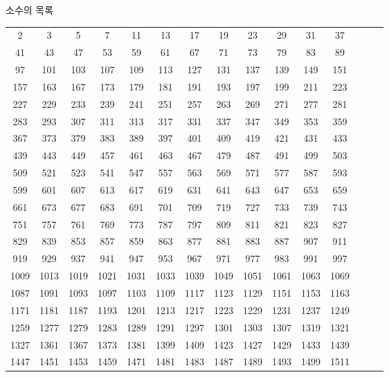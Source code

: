 \documentclass[10pt, a4paper]{article}
\begin{document}
\begin{center}
    \huge{소수의 목록}\normalsize\\
    \begin{longtable}{c c c c c c c c c c c c c c c}
        \hline
        2 & 3 & 5 & 7 & 11 & 13 & 17 & 19 & 23 & 29 & 31 & 37 \\
        41 & 43 & 47 & 53 & 59 & 61 & 67 & 71 & 73 & 79 & 83 & 89 \\
        97 & 101 & 103 & 107 & 109 & 113 & 127 & 131 & 137 & 139 & 149 & 151 \\
        157 & 163 & 167 & 173 & 179 & 181 & 191 & 193 & 197 & 199 & 211 & 223 \\
        227 & 229 & 233 & 239 & 241 & 251 & 257 & 263 & 269 & 271 & 277 & 281 \\
        283 & 293 & 307 & 311 & 313 & 317 & 331 & 337 & 347 & 349 & 353 & 359 \\
        367 & 373 & 379 & 383 & 389 & 397 & 401 & 409 & 419 & 421 & 431 & 433 \\
        439 & 443 & 449 & 457 & 461 & 463 & 467 & 479 & 487 & 491 & 499 & 503 \\
        509 & 521 & 523 & 541 & 547 & 557 & 563 & 569 & 571 & 577 & 587 & 593 \\
        599 & 601 & 607 & 613 & 617 & 619 & 631 & 641 & 643 & 647 & 653 & 659 \\
        661 & 673 & 677 & 683 & 691 & 701 & 709 & 719 & 727 & 733 & 739 & 743 \\
        751 & 757 & 761 & 769 & 773 & 787 & 797 & 809 & 811 & 821 & 823 & 827 \\
        829 & 839 & 853 & 857 & 859 & 863 & 877 & 881 & 883 & 887 & 907 & 911 \\
        919 & 929 & 937 & 941 & 947 & 953 & 967 & 971 & 977 & 983 & 991 & 997 \\
        1009 & 1013 & 1019 & 1021 & 1031 & 1033 & 1039 & 1049 & 1051 & 1061 & 1063 & 1069 \\
        1087 & 1091 & 1093 & 1097 & 1103 & 1109 & 1117 & 1123 & 1129 & 1151 & 1153 & 1163 \\
        1171 & 1181 & 1187 & 1193 & 1201 & 1213 & 1217 & 1223 & 1229 & 1231 & 1237 & 1249 \\
        1259 & 1277 & 1279 & 1283 & 1289 & 1291 & 1297 & 1301 & 1303 & 1307 & 1319 & 1321 \\
        1327 & 1361 & 1367 & 1373 & 1381 & 1399 & 1409 & 1423 & 1427 & 1429 & 1433 & 1439 \\
        1447 & 1451 & 1453 & 1459 & 1471 & 1481 & 1483 & 1487 & 1489 & 1493 & 1499 & 1511 \\

\end{longtable}
\end{center}
\end{document}
